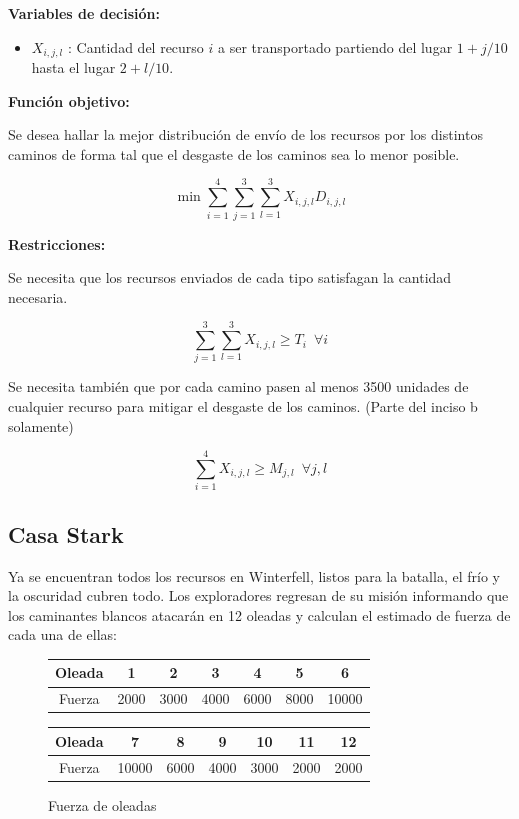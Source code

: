 \documentclass[a4paper,10pt,twocolumn]{article}
\theoremstyle{theorem}
\theoremstyle{definition}
\theoremstyle{remark}
\begin{document}
\textbf{Variables de decisi\'on:}

\begin{itemize}
\item $X_{i,j,l}$ : Cantidad del recurso $i$ a ser transportado partiendo del lugar $1 + j /10$ hasta el lugar $2 + l /10$.
\end{itemize}

\textbf{Funci\'on objetivo:}

Se desea hallar la mejor distribuci\'on de env\'io de los recursos por los distintos caminos de forma tal que el desgaste de los caminos sea lo menor posible.

$$
\min \sum^{4}_{i=1} \sum^{3}_{j=1} \sum^{3}_{l=1} X_{i, j, l} D_{i, j, l}
$$

\textbf{Restricciones:}

Se necesita que los recursos enviados de cada tipo satisfagan la cantidad necesaria.

$$
\sum^{3}_{j=1} \sum^{3}_{l=1} X_{i, j, l} \geq T_{i} \enspace \forall i
$$

Se necesita tambi\'en que por cada camino pasen al menos 3500 unidades de cualquier recurso para mitigar el desgaste de los caminos. (Parte del inciso b solamente)

$$
\sum^{4}_{i=1} X_{i, j, l} \geq M_{j, l} \enspace \forall j, l
$$

	\subsection{Casa Stark}\label{subsec:ejer_5}

Ya se encuentran todos los recursos en Winterfell, listos para la batalla, el frío y la oscuridad cubren todo. Los exploradores regresan de su misión informando que los caminantes blancos atacarán en 12 oleadas y calculan el estimado de fuerza de cada una de ellas:

\begin{figure}[h!]%
	\begin{center}
		\begin{tabular}{|c|c|c|c|c|c|c|} \hline
		Oleada	& 1		& 2		& 3	    & 4		& 5		& 6		\\ \hline
		Fuerza	& 2000	& 3000	& 4000	& 6000	& 8000	& 10000	\\ \hline
		\end{tabular}
		
		\begin{tabular}{|c|c|c|c|c|c|c|} \hline
		Oleada	& 7		& 8		& 9	    & 10	& 11	& 12	\\ \hline
		Fuerza	& 10000	& 6000	& 4000	& 3000	& 2000	& 2000	\\ \hline
		\end{tabular}
	\caption{Fuerza de oleadas}\label{fig:ejer_5_1}
	\end{center}
\end{figure}
\end{document}
